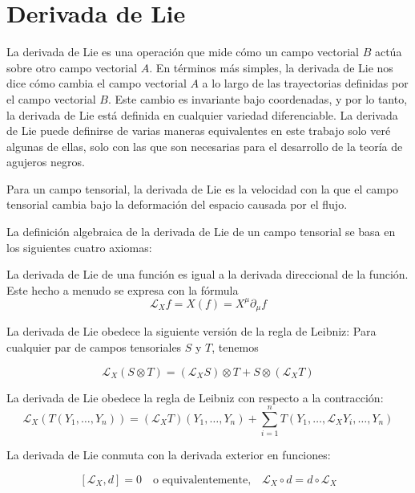 \section{Derivada de Lie}
La derivada de Lie es una operación que mide cómo un campo vectorial $B$ actúa sobre otro campo vectorial $A$. En términos más simples, la derivada de Lie nos dice cómo cambia el campo vectorial $A$ a lo largo de las trayectorias definidas por el campo vectorial $B$. Este cambio es invariante bajo coordenadas, y por lo tanto, la derivada de Lie está definida en cualquier variedad diferenciable.
La derivada de Lie puede definirse de varias maneras equivalentes en este trabajo solo veré algunas de ellas, solo con las que son necesarias para el desarrollo de la teoría de agujeros negros.

Para un campo tensorial, la derivada de Lie es la velocidad con la que el campo tensorial cambia bajo la deformación del espacio causada por el flujo.

La definición algebraica de la derivada de Lie de un campo tensorial se basa en los siguientes cuatro axiomas:

\begin{axiom}\label{ax:Lie1}
    La derivada de Lie de una función es igual a la derivada direccional de la función. Este hecho a menudo se expresa con la fórmula
    \[
    \mathcal{L}_X f = X(f) = X^\mu \partial_\mu f
    \]

\end{axiom}

\begin{axiom}\label{ax:Lie2}
    La derivada de Lie obedece la siguiente versión de la regla de Leibniz: Para cualquier par de campos tensoriales $S$ y $T$, tenemos

    \[
        \mathcal{L}_X(S \otimes T) = (\mathcal{L}_X S) \otimes T + S \otimes (\mathcal{L}_X T)
        \]
\end{axiom}

\begin{axiom}\label{ax:Lie3}
    La derivada de Lie obedece la regla de Leibniz con respecto a la contracción:
    \[
        \mathcal{L}_X(T(Y_1, \ldots, Y_n)) = (\mathcal{L}_X T)(Y_1, \ldots, Y_n) + \sum_{i=1}^n T(Y_1, \ldots, \mathcal{L}_X Y_i, \ldots, Y_n)
        \]
\end{axiom}

\begin{axiom}\label{ax:Lie4}
    La derivada de Lie conmuta con la derivada exterior en funciones:

    \[
    \left[\mathcal{L}_X, d\right] = 0 \quad \text{o equivalentemente,} \quad \mathcal{L}_X \circ d = d \circ \mathcal{L}_X
    \]
\end{axiom}

